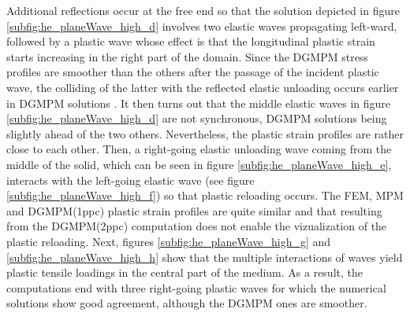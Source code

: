 Additional reflections occur at the free end so that the solution depicted in figure \ref{subfig:he_planeWave_high_d} involves two elastic waves propagating left-ward, followed by a plastic wave whose effect is that the longitudinal plastic strain starts increasing in the right part of the domain.
Since the DGMPM stress profiles are smoother than the others after the passage of the incident plastic wave, the colliding of the latter with the reflected elastic unloading occurs earlier in DGMPM solutions .
It then turns out that the middle elastic waves in figure \ref{subfig:he_planeWave_high_d} are not synchronous, DGMPM solutions being slightly ahead of the two others.
Nevertheless, the plastic strain profiles are rather close to each other.
%
Then, a right-going elastic unloading wave coming from the middle of the solid, which can be seen in figure \ref{subfig:he_planeWave_high_e}, interacts with the left-going elastic wave (see figure \ref{subfig:he_planeWave_high_f}) so that plastic reloading occurs.
The FEM, MPM and DGMPM(1ppc) plastic strain profiles are quite similar and that resulting from the DGMPM(2ppc) computation does not enable the vizualization of the plastic reloading.
Next, figures \ref{subfig:he_planeWave_high_g} and \ref{subfig:he_planeWave_high_h} show that the multiple interactions of waves yield plastic tensile loadings in the central part of the medium.
As a result, the computations end with three right-going plastic waves for which the numerical solutions show good agreement, although the DGMPM ones are smoother.



